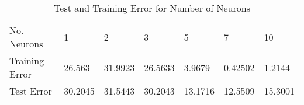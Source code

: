 \documentclass[titlepage]{scrartcl}
\begin{document}
\begin{table}[H]
\centering
\caption{Test and Training Error for Number of Neurons}
\label{my-label}
\begin{tabular}{lllllll}
No. Neurons    & 1       & 2       & 3       & 5       & 7       & 10      \\
Training Error & 26.563  & 31.9923 & 26.5633 & 3.9679  & 0.42502 & 1.2144  \\
Test Error     & 30.2045 & 31.5443 & 30.2043 & 13.1716 & 12.5509 & 15.3001
\end{tabular}
\end{table}

\printbibliography
\end{document}
